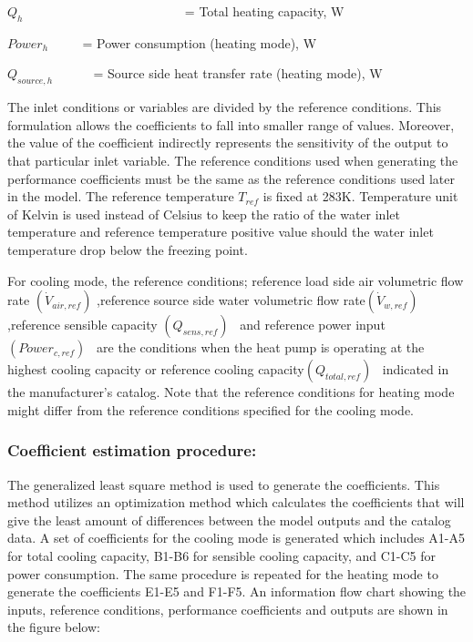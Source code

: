 \({Q_h}\) ~~~~~~~~~~~~~~~~~~~~~~~~ = Total heating capacity, W

\(Powe{r_h}\) ~~~~ = Power consumption (heating mode), W

\({Q_{source,h}}\) ~~~~~ = Source side heat transfer rate (heating mode), W

The inlet conditions or variables are divided by the reference conditions. This formulation allows the coefficients to fall into smaller range of values. Moreover, the value of the coefficient indirectly represents the sensitivity of the output to that particular inlet variable. The reference conditions used when generating the performance coefficients must be the same as the reference conditions used later in the model. The reference temperature \({T_{ref}}\) is fixed at 283K. Temperature unit of Kelvin is used instead of Celsius to keep the ratio of the water inlet temperature and reference temperature positive value should the water inlet temperature drop below the freezing point.

For cooling mode, the reference conditions; reference load side air volumetric flow rate \(\left( {{{\dot V}_{air,ref}}} \right)\) ,reference source side water volumetric flow rate\(\left( {{{\dot V}_{w,ref}}} \right)\) ,reference sensible capacity \(\left( {{Q_{sens,ref}}} \right)\) ~and reference power input \(\left( {Powe{r_{c,ref}}} \right)\) ~are the conditions when the heat pump is operating at the highest cooling capacity or reference cooling capacity\(\left( {{Q_{total,ref}}} \right)\) ~indicated in the manufacturer's catalog. Note that the reference conditions for heating mode might differ from the reference conditions specified for the cooling mode.

\subsubsection{Coefficient estimation procedure:}\label{coefficient-estimation-procedure}

The generalized least square method is used to generate the coefficients. This method utilizes an optimization method which calculates the coefficients that will give the least amount of differences between the model outputs and the catalog data. A set of coefficients for the cooling mode is generated which includes A1-A5 for total cooling capacity, B1-B6 for sensible cooling capacity, and C1-C5 for power consumption. The same procedure is repeated for the heating mode to generate the coefficients E1-E5 and F1-F5. An information flow chart showing the inputs, reference conditions, performance coefficients and outputs are shown in the figure below:


